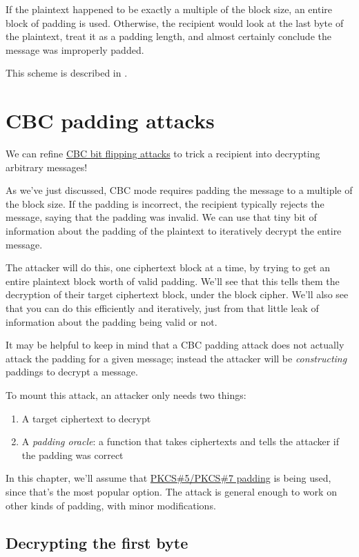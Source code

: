 \documentclass[11pt,ebook,table,dvipsnames]{memoir}
\begin{document}
If the plaintext happened to be exactly a multiple of the block size,
an entire block of padding is used. Otherwise, the recipient would
look at the last byte of the plaintext, treat it as a padding length,
and almost certainly conclude the message was improperly padded.

This scheme is described in \cite{cms:padding}.
\section{CBC padding attacks}
\label{sec-2-3-7}

We can refine \hyperref[CBC-bit-flipping-attacks]{CBC bit flipping attacks} to trick a recipient into
decrypting arbitrary messages!

As we've just discussed, \gls{CBC mode} requires padding the message
to a multiple of the block size. If the padding is incorrect, the
recipient typically rejects the message, saying that the padding was
invalid. We can use that tiny bit of information about the padding of
the plaintext to iteratively decrypt the entire message.

The attacker will do this, one ciphertext block at a time, by trying
to get an entire plaintext block worth of valid padding. We'll see
that this tells them the decryption of their target ciphertext block,
under the block cipher. We'll also see that you can do this
efficiently and iteratively, just from that little leak of information
about the padding being valid or not.

It may be helpful to keep in mind that a CBC padding attack does not
actually attack the padding for a given message; instead the attacker
will be \emph{constructing} paddings to decrypt a message.

To mount this attack, an attacker only needs two things:

\begin{enumerate}
\item A target ciphertext to decrypt
\item A \emph{padding oracle}: a function that takes ciphertexts and tells
the attacker if the padding was correct
\end{enumerate}

In this chapter, we'll assume that \hyperref[PKCS-5/PKCS-7-padding]{PKCS\#5/PKCS\#7 padding} is being
used, since that's the most popular option. The attack is general
enough to work on other kinds of padding, with minor modifications.

\subsection{Decrypting the first byte}
\label{sec-2-3-7-1}
\end{document}
